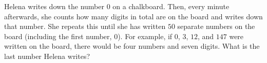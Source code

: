 Helena writes down the number $0$ on a chalkboard. Then, every minute afterwards, she counts how many digits in total are on the board and writes down that number. She repeats this until she has written $50$ separate numbers on the board (including the first number, 0). For example, if $0$, $3$, $12$, and $147$ were written on the board, there would be four numbers and seven digits. What is the last number Helena writes?
